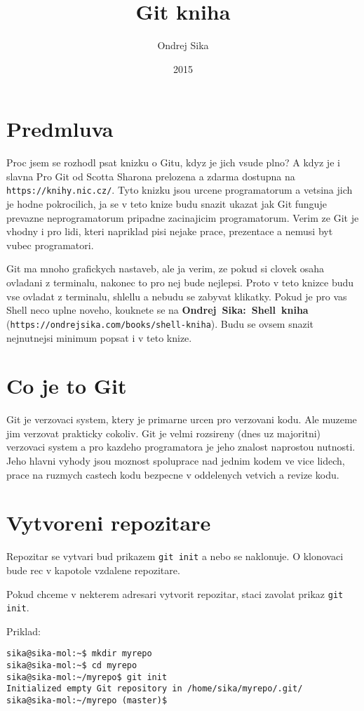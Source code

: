 \documentclass[12pt,a5paper]{article}
\title{Git kniha}
\author{Ondrej Sika}
\date{2015}
\begin{document}


\section{Predmluva}

Proc jsem se rozhodl psat knizku o Gitu, kdyz je jich vsude plno? A kdyz je i slavna Pro Git od Scotta Sharona prelozena a zdarma dostupna na \lstinline|https://knihy.nic.cz/|. Tyto knizku jsou urcene programatorum a vetsina jich je hodne pokrocilich, ja se v teto knize budu snazit ukazat jak Git funguje prevazne neprogramatorum pripadne zacinajicim programatorum. Verim ze Git je vhodny i pro lidi, kteri napriklad pisi nejake prace, prezentace a nemusi byt vubec programatori.

Git ma mnoho grafickych nastaveb, ale ja verim, ze pokud si clovek osaha ovladani z terminalu, nakonec to pro nej bude nejlepsi. Proto v teto knizce budu vse ovladat z terminalu, shlellu a nebudu se zabyvat klikatky. Pokud je pro vas Shell neco uplne noveho, kouknete se na {\bf Ondrej~Sika:~Shell~kniha} (\lstinline|https://ondrejsika.com/books/shell-kniha|). Budu se ovsem snazit nejnutnejsi minimum popsat i v teto knize.

\section{Co je to Git}

Git je verzovaci system, ktery je primarne urcen pro verzovani kodu. Ale muzeme jim verzovat prakticky cokoliv. Git je velmi rozsireny (dnes uz majoritni) verzovaci system a pro kazdeho programatora je jeho znalost naprostou nutnosti. Jeho hlavni vyhody jsou moznost spoluprace nad jednim kodem ve vice lidech, prace na ruzmych castech kodu bezpecne v oddelenych vetvich a revize kodu.

\section{Vytvoreni repozitare}

Repozitar se vytvari bud prikazem \lstinline|git init| a nebo se naklonuje. O klonovaci bude rec v kapotole vzdalene repozitare.

Pokud chceme v nekterem adresari vytvorit repozitar, staci zavolat prikaz \lstinline|git init|.

Priklad:

\begin{lstlisting}
sika@sika-mol:~$ mkdir myrepo
sika@sika-mol:~$ cd myrepo
sika@sika-mol:~/myrepo$ git init
Initialized empty Git repository in /home/sika/myrepo/.git/
sika@sika-mol:~/myrepo (master)$ 
\end{lstlisting}
\end{document}
